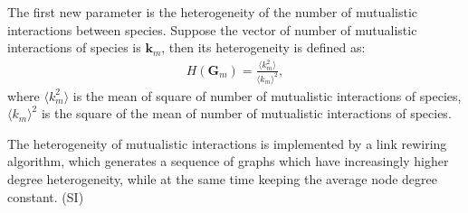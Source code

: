\documentclass[a4paper,fleqn,12pt]{article}
\begin{document}
The first new parameter is the heterogeneity of the number of mutualistic interactions between species.
Suppose the vector of number of mutualistic interactions of species is $\mathbf{k}_m$,
then its heterogeneity is defined as:
\begin{align}
H(\mathbf{G}_m) = \frac{\langle k_m^2 \rangle}{\langle k_m \rangle ^2},
\end{align} 
where $\langle k_m^2 \rangle$ is the mean of square of number of mutualistic interactions of species, $\langle k_m \rangle ^2$ is the square of the mean of number of mutualistic interactions of species.

The heterogeneity of mutualistic interactions is implemented by a link rewiring algorithm,
which generates a sequence of graphs which have increasingly higher degree heterogeneity, while at the same time keeping the average node degree constant.
(SI)
\end{document}
